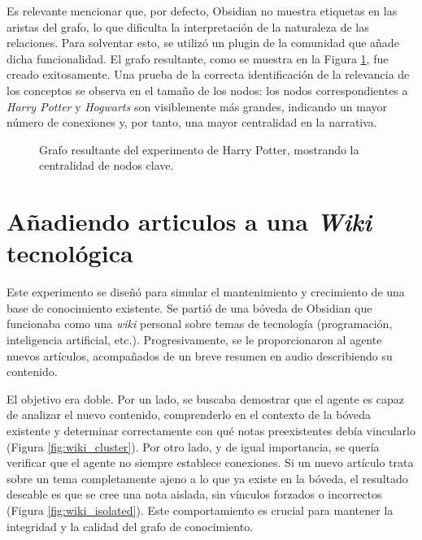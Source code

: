 Es relevante mencionar que, por defecto, Obsidian no muestra etiquetas en las aristas del grafo, lo que dificulta la interpretación de la naturaleza de las relaciones. Para solventar esto, se utilizó un plugin de la comunidad que añade dicha funcionalidad. El grafo resultante, como se muestra en la Figura \ref{fig:hp_graph}, fue creado exitosamente. Una prueba de la correcta identificación de la relevancia de los conceptos se observa en el tamaño de los nodos: los nodos correspondientes a \textit{Harry Potter} y \textit{Hogwarts} son visiblemente más grandes, indicando un mayor número de conexiones y, por tanto, una mayor centralidad en la narrativa.

\begin{figure}[h]
    \centering
    \caption{Grafo resultante del experimento de Harry Potter, mostrando la centralidad de nodos clave.}
    \label{fig:hp_graph}
\end{figure}


\section{Añadiendo articulos a una \textit{Wiki} tecnológica}
Este experimento se diseñó para simular el mantenimiento y crecimiento de una base de conocimiento existente. Se partió de una bóveda de Obsidian que funcionaba como una \textit{wiki} personal sobre temas de tecnología (programación, inteligencia artificial, etc.). Progresivamente, se le proporcionaron al agente nuevos artículos, acompañados de un breve resumen en audio describiendo su contenido.

El objetivo era doble. Por un lado, se buscaba demostrar que el agente es capaz de analizar el nuevo contenido, comprenderlo en el contexto de la bóveda existente y determinar correctamente con qué notas preexistentes debía vincularlo (Figura \ref{fig:wiki_cluster}). Por otro lado, y de igual importancia, se quería verificar que el agente no siempre establece conexiones. Si un nuevo artículo trata sobre un tema completamente ajeno a lo que ya existe en la bóveda, el resultado deseable es que se cree una nota aislada, sin vínculos forzados o incorrectos (Figura \ref{fig:wiki_isolated}). Este comportamiento es crucial para mantener la integridad y la calidad del grafo de conocimiento.

